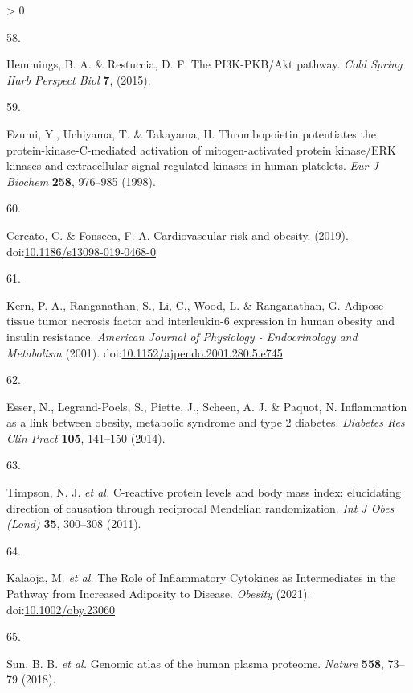 \documentclass[11pt,twoside]{bristolthesis}
\newlength{\cslhangindent}
\newlength{\csllabelwidth}
\newenvironment{CSLReferences}[2] %
 {%
  \setlength{\parindent}{0pt}
  \ifodd #1 \everypar{\setlength{\hangindent}{\cslhangindent}}\ignorespaces\fi
  \ifnum #2 > 0
  \setlength{\parskip}{#2\baselineskip}
  \fi
 }%
 {}
\newcommand{\CSLLeftMargin}[1]{\parbox[t]{\csllabelwidth}{#1}}
\newcommand{\CSLRightInline}[1]{\parbox[t]{\linewidth - \csllabelwidth}{#1}\break}
\begin{document}
\begin{CSLReferences}{0}{0}
\leavevmode\hypertarget{ref-Hemmings2015}{}%
\CSLLeftMargin{58. }
\CSLRightInline{Hemmings, B. A. \& Restuccia, D. F. {The PI3K-PKB/Akt pathway}. \emph{Cold Spring Harb Perspect Biol} \textbf{7}, (2015).}

\leavevmode\hypertarget{ref-Ezumi1998}{}%
\CSLLeftMargin{59. }
\CSLRightInline{Ezumi, Y., Uchiyama, T. \& Takayama, H. {Thrombopoietin potentiates the protein-kinase-C-mediated activation of mitogen-activated protein kinase/ERK kinases and extracellular signal-regulated kinases in human platelets}. \emph{Eur J Biochem} \textbf{258}, 976--985 (1998).}

\leavevmode\hypertarget{ref-Cercato2019}{}%
\CSLLeftMargin{60. }
\CSLRightInline{Cercato, C. \& Fonseca, F. A. {Cardiovascular risk and obesity}. (2019). doi:\href{https://doi.org/10.1186/s13098-019-0468-0}{10.1186/s13098-019-0468-0}}

\leavevmode\hypertarget{ref-Kern2001}{}%
\CSLLeftMargin{61. }
\CSLRightInline{Kern, P. A., Ranganathan, S., Li, C., Wood, L. \& Ranganathan, G. {Adipose tissue tumor necrosis factor and interleukin-6 expression in human obesity and insulin resistance}. \emph{American Journal of Physiology - Endocrinology and Metabolism} (2001). doi:\href{https://doi.org/10.1152/ajpendo.2001.280.5.e745}{10.1152/ajpendo.2001.280.5.e745}}

\leavevmode\hypertarget{ref-Esser2014}{}%
\CSLLeftMargin{62. }
\CSLRightInline{Esser, N., Legrand-Poels, S., Piette, J., Scheen, A. J. \& Paquot, N. {Inflammation as a link between obesity, metabolic syndrome and type 2 diabetes}. \emph{Diabetes Res Clin Pract} \textbf{105}, 141--150 (2014).}

\leavevmode\hypertarget{ref-Timpson2011}{}%
\CSLLeftMargin{63. }
\CSLRightInline{Timpson, N. J. \emph{et al.} {C-reactive protein levels and body mass index: elucidating direction of causation through reciprocal Mendelian randomization}. \emph{Int J Obes (Lond)} \textbf{35}, 300--308 (2011).}

\leavevmode\hypertarget{ref-Kalaoja2021}{}%
\CSLLeftMargin{64. }
\CSLRightInline{Kalaoja, M. \emph{et al.} {The Role of Inflammatory Cytokines as Intermediates in the Pathway from Increased Adiposity to Disease}. \emph{Obesity} (2021). doi:\href{https://doi.org/10.1002/oby.23060}{10.1002/oby.23060}}

\leavevmode\hypertarget{ref-Sun2018}{}%
\CSLLeftMargin{65. }
\CSLRightInline{Sun, B. B. \emph{et al.} {Genomic atlas of the human plasma proteome}. \emph{Nature} \textbf{558}, 73--79 (2018).}


\end{CSLReferences}
\end{document}
